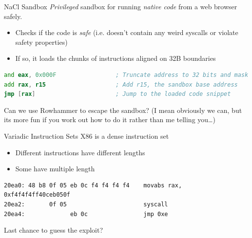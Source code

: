 \documentclass[9pt,aspectratio=169]{beamer}
\begin{document}
\begin{frame}[label={sec:org3d4070e},fragile]{NaCl Sandbox}
 \emph{Privileged} sandbox for running \emph{native code} from a web browser safely.
\begin{itemize}
\item Checks if the code is \emph{safe} (i.e. doesn't contain any weird syscalls or violate safety properties)
\item If so, it loads the chunks of instructions aligned on 32B boundaries
\end{itemize}

\begin{lstlisting}[language=asm,numbers=none]
and eax, 0x000F                 ; Truncate address to 32 bits and mask to be 32-byte aligned
add rax, r15                    ; Add r15, the sandbox base address
jmp [rax]                       ; Jump to the loaded code snippet
\end{lstlisting}

\vfill
\begin{block}{Can we use Rowhammer to escape the sandbox?}
\footnotesize
(I mean obviously we can, but its more fun if you work out how to do
it rather than me telling you\ldots{})
\end{block}
\end{frame}

\begin{frame}[label={sec:orgce5589d},fragile]{Variadic Instruction Sets}
 X86 is a dense instruction set
\begin{itemize}
\item Different instructions have different lengths
\item Some have multiple length
\end{itemize}

\begin{lstlisting}[language=text,numbers=none]
20ea0: 48 b8 0f 05 eb 0c f4 f4 f4 f4    movabs rax, 0xf4f4f4ff40ceb050f
20ea2:       0f 05                      syscall
20ea4:             eb 0c                jmp 0xe
\end{lstlisting}

\begin{block}{Last chance to guess the exploit?}
\end{block}
\end{frame}
\end{document}
